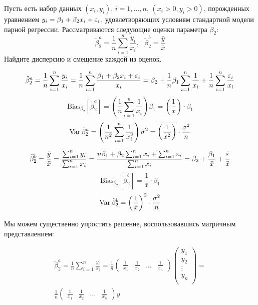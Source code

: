 \begin{problem}
Пусть есть набор данных $(x_i, y_i)$, $i = 1, \ldots, n$, $(x_i>0, y_i>0)$, порожденных уравнением $y_i = \beta_1 + \beta_2 x_i + \varepsilon_i$, удовлетворяющих условиям стандартной модели парной регрессии.
Рассматриваются следующие оценки параметра $\beta_2$:
\[
\tilde{\beta}_2^a = \frac{1}{n}\sum_{i=1}^n \frac{y_i}{x_i}, \text{ } \tilde{\beta}_2^b = \frac{\bar{y}}{\bar{x}}
\]
Найдите дисперсию и смещение каждой из оценок.


\begin{sol}

\[ \tilde{\beta}_2^a = \frac{1}{n} \sum_{i = 1}^n \frac{y_i}{x_i} = \frac{1}{n} \sum_{i = 1}^n \frac{\beta_1 + \beta_2 x_i + \varepsilon_i}{x_i} = \beta_2 + \frac{1}{n} \beta_1 \sum_{i = 1}^n \frac{1}{x_i} + \frac{1}{n} \sum_{i = 1}^n \frac{\varepsilon_i}{x_i}   \]
\[ \text{Bias}_{\beta_2} \left[\tilde{\beta}_2^a\right] = \left(\frac{1}{n} \sum_{i = 1}^n \frac{1}{x_i} \right) \beta_1 = \overline{\left(\frac{1}{x}\right)} \cdot \beta_1\]
\[ \operatorname{Var}\tilde{\beta}_2^a = \left(\frac{1}{n^2} \sum_{i = 1}^n \frac{1}{x_i^2} \right) \sigma^2 = \overline{\left(\frac{1}{x^2}\right)} \cdot \frac{\sigma^2}{n}  \]

\[ \tilde{\beta}_2^b = \frac{\bar{y}}{\bar{x}} = \frac{\sum_{i=1}^n y_i}{\sum_{i=1}^n x_i} = \frac{n\beta_1 + \beta_2 \sum_{i = 1}^n x_i + \sum_{i = 1}^n \varepsilon_i}{\sum_{i=1}^n x_i} = \beta_2 + \frac{\beta_1}{\bar{x}} + \frac{\bar{\varepsilon}}{\bar{x}}  \]
\[ \text{Bias}_{\beta_2} \left[\tilde{\beta}_2^b\right] = \frac{1}{\bar{x}} \cdot \beta_1 \]
\[  \operatorname{Var}\tilde{\beta}_2^b = \left(\frac{1}{\bar{x}}\right)^2 \cdot \frac{\sigma^2}{n} \]


Мы можем существенно упростить решение, воспользовавшись матричным представлением:

\begin{multline*}
\tilde{\beta}_2^a = \frac{1}{n}\sum_{i=1}^n \frac{y_i}{x_i} = \frac{1}{n} \begin{pmatrix}
\frac{1}{x_1} & \frac{1}{x_2} & \ldots & \frac{1}{x_n}
\end{pmatrix} \begin{pmatrix}
y_1\\
y_2\\
\vdots\\
y_n\\
\end{pmatrix} = \\
 \frac{1}{n} \begin{pmatrix}
\frac{1}{x_1} & \frac{1}{x_2} & \ldots & \frac{1}{x_n}
\end{pmatrix} y
\end{multline*}


\end{sol}
\end{problem}
